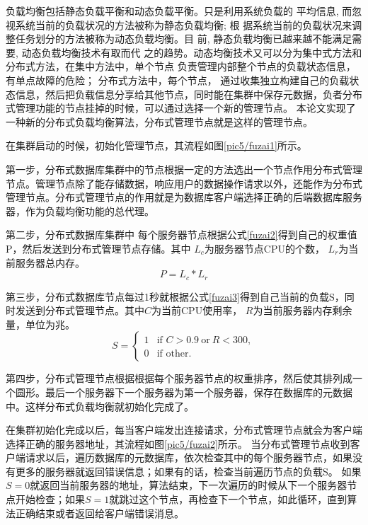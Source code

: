 负载均衡包括静态负载平衡和动态负载平衡。只是利用系统负载的
平均信息, 而忽视系统当前的负载状况的方法被称为静态负载均衡; 根
据系统当前的负载状况来调整任务划分的方法被称为动态负载均衡。目
前, 静态负载均衡已越来越不能满足需要, 动态负载均衡技术有取而代
之的趋势。动态均衡技术又可以分为集中式方法和分布式方法，在集中方法中，单个节点
负责管理内部整个节点的负载状态信息，有单点故障的危险；
分布式方法中，每个节点，
通过收集独立构建自己的负载状态信息，然后把负载信息分享给其他节点，同时能在集群中保存元数据，负者分布式管理功能的节点挂掉的时候，可以通过选择一个新的管理节点。
本论文实现了一种新的分布式负载均衡算法，分布式管理节点就是这样的管理节点。

在集群启动的时候，初始化管理节点，其流程如图\ref{pic5/fuzai1}所示。

第一步，分布式数据库集群中的节点根据一定的方法选出一个节点作用分布式管理节点。管理节点除了能存储数据，响应用户的数据操作请求以外，还能作为分布式管理节点。分布式管理节点的作用就是为数据库客户端选择正确的后端数据库服务器，作为负载均衡功能的总代理。

第二步，分布式数据库集群中
每个服务器节点根据公式\ref{fuzai2}得到自己的权重值P，然后发送到分布式管理节点存储。其中
$ L_c $为服务器节点CPU的个数， $ L_r $为当前服务器总内存。
\begin{equation}
P=L_c * L_r \label{fuzai2}
\end{equation}

第三步，分布式数据库节点每过1秒就根据公式\ref{fuzai3}得到自己当前的负载S，同时发送到分布式管理节点。其中$ C $为当前CPU使用率， $ R $为当前服务器内存剩余量，单位为兆。
\begin{equation}
S =
\begin{cases}
1 & \text{if } C >0.9 \: \text{or} \: R<300,\\
0 & \text{if } \text{other}.
\end{cases}   \label{fuzai3}
\end{equation}

第四步，分布式管理节点根据根据每个服务器节点的权重排序，然后使其排列成一个圆形。最后一个服务器下一个服务器为第一个服务器，保存在数据库的元数据中。这样分布式负载均衡就初始化完成了。

在集群初始化完成以后，每当客户端发出连接请求，分布式管理节点就会为客户端选择正确的服务器地址，其流程如图\ref{pic5/fuzai2}所示。
当分布式管理节点收到客户端请求以后，遍历数据库的元数据库，依次检查其中的每个服务器节点，如果没有更多的服务器就返回错误信息；如果有的话，检查当前遍历节点的负载S。
如果$ S=0 $就返回当前服务器的地址，算法结束，下一次遍历的时候从下一个服务器节点开始检查；如果$ S=1 $就跳过这个节点，再检查下一个节点，如此循环，直到算法正确结束或者返回给客户端错误消息。
